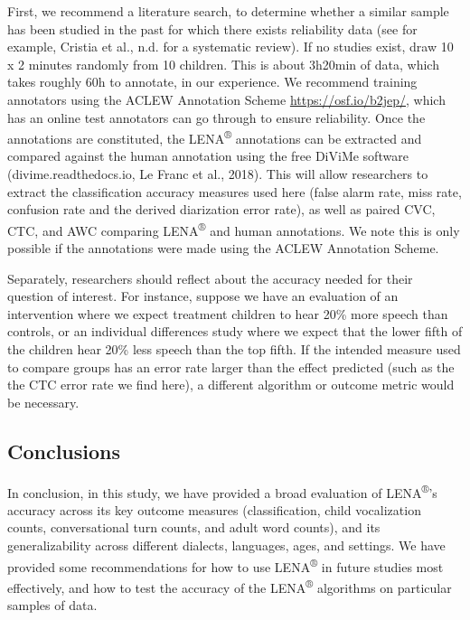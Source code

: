\documentclass[english,table,man,floatsintext]{apa6}
\begin{document}
First, we recommend a literature search, to determine whether a similar sample has been studied in the past for which there exists reliability data (see for example, Cristia et al., n.d. for a systematic review). If no studies exist, draw 10 x 2 minutes randomly from 10 children. This is about 3h20min of data, which takes roughly 60h to annotate, in our experience. We recommend training annotators using the ACLEW Annotation Scheme \url{https://osf.io/b2jep/}, which has an online test annotators can go through to ensure reliability. Once the annotations are constituted, the LENA\textsuperscript{®} annotations can be extracted and compared against the human annotation using the free DiViMe software (divime.readthedocs.io, Le Franc et al., 2018). This will allow researchers to extract the classification accuracy measures used here (false alarm rate, miss rate, confusion rate and the derived diarization error rate), as well as paired CVC, CTC, and AWC comparing LENA\textsuperscript{®} and human annotations. We note this is only possible if the annotations were made using the ACLEW Annotation Scheme.

Separately, researchers should reflect about the accuracy needed for their question of interest. For instance, suppose we have an evaluation of an intervention where we expect treatment children to hear 20\% more speech than controls, or an individual differences study where we expect that the lower fifth of the children hear 20\% less speech than the top fifth. If the intended measure used to compare groups has an error rate larger than the effect predicted (such as the the CTC error rate we find here), a different algorithm or outcome metric would be necessary.

\hypertarget{conclusions}{%
\subsection{Conclusions}\label{conclusions}}

In conclusion, in this study, we have provided a broad evaluation of LENA\textsuperscript{®}'s accuracy across its key outcome measures (classification, child vocalization counts, conversational turn counts, and adult word counts), and its generalizability across different dialects, languages, ages, and settings. We have provided some recommendations for how to use LENA\textsuperscript{®} in future studies most effectively, and how to test the accuracy of the LENA\textsuperscript{®} algorithms on particular samples of data.
\end{document}
